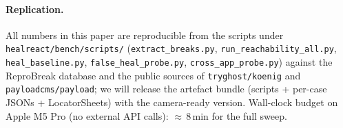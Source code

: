 \paragraph{Replication.}
All numbers in this paper are reproducible from the scripts under \texttt{healreact/bench/scripts/} (\texttt{extract\_breaks.py}, \texttt{run\_reachability\_all.py}, \texttt{heal\_baseline.py}, \texttt{false\_heal\_probe.py}, \texttt{cross\_app\_probe.py}) against the ReproBreak database and the public sources of \texttt{tryghost/koenig} and \texttt{payloadcms/payload}; we will release the artefact bundle (scripts + per-case JSONs + LocatorSheets) with the camera-ready version. Wall-clock budget on Apple M5 Pro (no external API calls): $\approx$\,8\,min for the full sweep.
